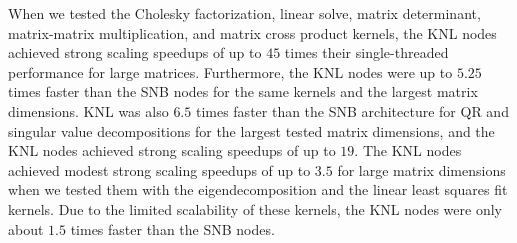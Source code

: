 When we tested the Cholesky factorization, linear solve, matrix determinant, matrix-matrix
multiplication, and matrix cross product kernels, the KNL nodes achieved strong scaling
speedups of up to $45$ times their single-threaded performance for large matrices.
Furthermore, the KNL nodes were up to $5.25$ times faster than the SNB nodes for the same
kernels and the largest matrix dimensions. KNL was also $6.5$ times faster than the SNB
architecture for QR and singular value decompositions for the largest tested matrix
dimensions, and the KNL nodes achieved strong scaling speedups of up to $19$. The KNL
nodes achieved modest strong scaling speedups of up to $3.5$ for large matrix dimensions
when we tested them with the eigendecomposition and the linear least squares fit kernels.
Due to the limited scalability of these kernels, the KNL nodes were only about $1.5$ times
faster than the SNB nodes.


